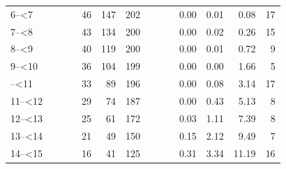 \documentclass[]{elsarticle} %
\begin{document}
\begin{table}[H]
\begin{tabular}[t]{l>{}r>{}r>{}rrrr>{}r>{}r>{}rrrrr}
6--<7 & \cellcolor[HTML]{ececec}{0.05} & \cellcolor[HTML]{ececec}{0.07} & \cellcolor[HTML]{ececec}{0.47} & 46 & 147 & 202 & \cellcolor[HTML]{ececec}{0.00} & \cellcolor[HTML]{ececec}{0.57} & \cellcolor[HTML]{ececec}{3.50} & 0.00 & 0.01 & 0.08 & 17\\
7--<8 & \cellcolor[HTML]{ececec}{0.05} & \cellcolor[HTML]{ececec}{0.08} & \cellcolor[HTML]{ececec}{0.34} & 43 & 134 & 200 & \cellcolor[HTML]{ececec}{0.00} & \cellcolor[HTML]{ececec}{0.69} & \cellcolor[HTML]{ececec}{10.97} & 0.00 & 0.02 & 0.26 & 15\\
8--<9 & \cellcolor[HTML]{ececec}{0.04} & \cellcolor[HTML]{ececec}{0.08} & \cellcolor[HTML]{ececec}{0.81} & 40 & 119 & 200 & \cellcolor[HTML]{ececec}{0.00} & \cellcolor[HTML]{ececec}{0.31} & \cellcolor[HTML]{ececec}{30.82} & 0.00 & 0.01 & 0.72 & 9\\
9--<10 & \cellcolor[HTML]{ececec}{0.03} & \cellcolor[HTML]{ececec}{0.09} & \cellcolor[HTML]{ececec}{2.15} & 36 & 104 & 199 & \cellcolor[HTML]{ececec}{0.00} & \cellcolor[HTML]{ececec}{0.00} & \cellcolor[HTML]{ececec}{70.97} & 0.00 & 0.00 & 1.66 & 5\\
\addlinespace
10--<11 & \cellcolor[HTML]{ececec}{0.05} & \cellcolor[HTML]{ececec}{0.37} & \cellcolor[HTML]{ececec}{4.42} & 33 & 89 & 196 & \cellcolor[HTML]{ececec}{0.00} & \cellcolor[HTML]{ececec}{3.24} & \cellcolor[HTML]{ececec}{133.85} & 0.00 & 0.08 & 3.14 & 17\\
11--<12 & \cellcolor[HTML]{ececec}{0.11} & \cellcolor[HTML]{ececec}{1.25} & \cellcolor[HTML]{ececec}{7.63} & 29 & 74 & 187 & \cellcolor[HTML]{ececec}{0.00} & \cellcolor[HTML]{ececec}{18.14} & \cellcolor[HTML]{ececec}{218.80} & 0.00 & 0.43 & 5.13 & 8\\
12--<13 & \cellcolor[HTML]{ececec}{0.26} & \cellcolor[HTML]{ececec}{2.85} & \cellcolor[HTML]{ececec}{11.77} & 25 & 61 & 172 & \cellcolor[HTML]{ececec}{1.38} & \cellcolor[HTML]{ececec}{47.17} & \cellcolor[HTML]{ececec}{315.17} & 0.03 & 1.11 & 7.39 & 8\\
13--<14 & \cellcolor[HTML]{ececec}{0.48} & \cellcolor[HTML]{ececec}{5.08} & \cellcolor[HTML]{ececec}{16.85} & 21 & 49 & 150 & \cellcolor[HTML]{ececec}{6.25} & \cellcolor[HTML]{ececec}{90.28} & \cellcolor[HTML]{ececec}{404.93} & 0.15 & 2.12 & 9.49 & 7\\
14--<15 & \cellcolor[HTML]{ececec}{0.77} & \cellcolor[HTML]{ececec}{7.67} & \cellcolor[HTML]{ececec}{22.30} & 16 & 41 & 125 & \cellcolor[HTML]{ececec}{13.02} & \cellcolor[HTML]{ececec}{142.45} & \cellcolor[HTML]{ececec}{477.60} & 0.31 & 3.34 & 11.19 & 16\\

\end{tabular}
\end{table}
\end{document}
